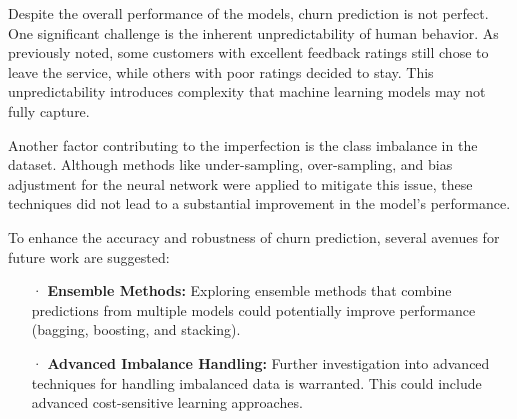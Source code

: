 \documentclass[12pt]{article}
\begin{document}
Despite the overall performance of the models, churn prediction is not perfect. One significant challenge is the inherent unpredictability of human behavior. As previously noted, some customers with excellent feedback ratings still chose to leave the service, while others with poor ratings decided to stay. This unpredictability introduces complexity that machine learning models may not fully capture.

Another factor contributing to the imperfection is the class imbalance in the dataset. Although methods like under-sampling, over-sampling, and bias adjustment for the neural network were applied to mitigate this issue, these techniques did not lead to a substantial improvement in the model's performance. 

To enhance the accuracy and robustness of churn prediction, several avenues for future work are suggested:
\begin{itemize}
    \item[·] \textbf{Ensemble Methods:} Exploring ensemble methods that combine predictions from multiple models could potentially improve performance (bagging, boosting, and stacking).
    \item[·] \textbf{Advanced Imbalance Handling:} Further investigation into advanced techniques for handling imbalanced data is warranted. This could include advanced cost-sensitive learning approaches.
\end{itemize}
\end{document}
